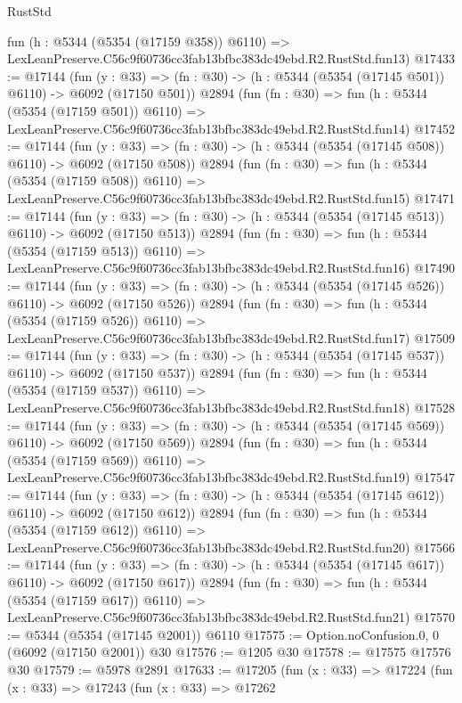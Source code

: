 \begin{lexlean}{RustStd}
\begin{coremodule}
    fun (h : @5344 (@5354 (@17159 @358)) @6110) =>
    LexLeanPreserve.C56c9f60736cc3fab13bfbc383dc49ebd.R2.RustStd.fun13)
@17433 := @17144
    (fun (y : @33) => (fn : @30) -> (h : @5344 (@5354 (@17145 @501)) @6110) -> @6092 (@17150 @501))
    @2894
    (fun (fn : @30) =>
    fun (h : @5344 (@5354 (@17159 @501)) @6110) =>
    LexLeanPreserve.C56c9f60736cc3fab13bfbc383dc49ebd.R2.RustStd.fun14)
@17452 := @17144
    (fun (y : @33) => (fn : @30) -> (h : @5344 (@5354 (@17145 @508)) @6110) -> @6092 (@17150 @508))
    @2894
    (fun (fn : @30) =>
    fun (h : @5344 (@5354 (@17159 @508)) @6110) =>
    LexLeanPreserve.C56c9f60736cc3fab13bfbc383dc49ebd.R2.RustStd.fun15)
@17471 := @17144
    (fun (y : @33) => (fn : @30) -> (h : @5344 (@5354 (@17145 @513)) @6110) -> @6092 (@17150 @513))
    @2894
    (fun (fn : @30) =>
    fun (h : @5344 (@5354 (@17159 @513)) @6110) =>
    LexLeanPreserve.C56c9f60736cc3fab13bfbc383dc49ebd.R2.RustStd.fun16)
@17490 := @17144
    (fun (y : @33) => (fn : @30) -> (h : @5344 (@5354 (@17145 @526)) @6110) -> @6092 (@17150 @526))
    @2894
    (fun (fn : @30) =>
    fun (h : @5344 (@5354 (@17159 @526)) @6110) =>
    LexLeanPreserve.C56c9f60736cc3fab13bfbc383dc49ebd.R2.RustStd.fun17)
@17509 := @17144
    (fun (y : @33) => (fn : @30) -> (h : @5344 (@5354 (@17145 @537)) @6110) -> @6092 (@17150 @537))
    @2894
    (fun (fn : @30) =>
    fun (h : @5344 (@5354 (@17159 @537)) @6110) =>
    LexLeanPreserve.C56c9f60736cc3fab13bfbc383dc49ebd.R2.RustStd.fun18)
@17528 := @17144
    (fun (y : @33) => (fn : @30) -> (h : @5344 (@5354 (@17145 @569)) @6110) -> @6092 (@17150 @569))
    @2894
    (fun (fn : @30) =>
    fun (h : @5344 (@5354 (@17159 @569)) @6110) =>
    LexLeanPreserve.C56c9f60736cc3fab13bfbc383dc49ebd.R2.RustStd.fun19)
@17547 := @17144
    (fun (y : @33) => (fn : @30) -> (h : @5344 (@5354 (@17145 @612)) @6110) -> @6092 (@17150 @612))
    @2894
    (fun (fn : @30) =>
    fun (h : @5344 (@5354 (@17159 @612)) @6110) =>
    LexLeanPreserve.C56c9f60736cc3fab13bfbc383dc49ebd.R2.RustStd.fun20)
@17566 := @17144
    (fun (y : @33) => (fn : @30) -> (h : @5344 (@5354 (@17145 @617)) @6110) -> @6092 (@17150 @617))
    @2894
    (fun (fn : @30) =>
    fun (h : @5344 (@5354 (@17159 @617)) @6110) =>
    LexLeanPreserve.C56c9f60736cc3fab13bfbc383dc49ebd.R2.RustStd.fun21)
@17570 := @5344 (@5354 (@17145 @2001)) @6110
@17575 := Option.noConfusion.{0, 0} (@6092 (@17150 @2001)) @30
@17576 := @1205 @30
@17578 := @17575 @17576 @30
@17579 := @5978 @2891
@17633 := @17205
    (fun (x : @33) =>
    @17224
      (fun (x : @33) =>
      @17243
        (fun (x : @33) =>
        @17262

\end{coremodule}
\end{lexlean}
